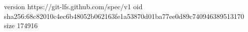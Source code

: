 version https://git-lfs.github.com/spec/v1
oid sha256:68c82010c4ec6b48052b062163fe1a53870d01ba77ee0d89c740946389513170
size 174916
